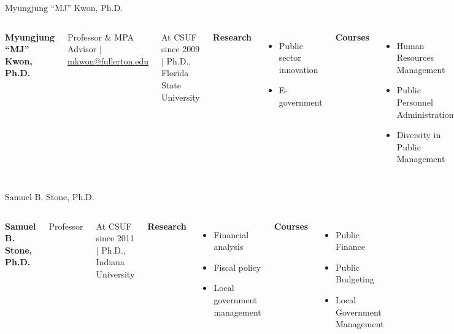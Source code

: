 \documentclass[10pt,aspectratio=169]{beamer}
\begin{document}
\begin{frame}{Myungjung ``MJ'' Kwon, Ph.D.}
\begin{columns}[T,onlytextwidth]
    \raggedright
  {\large\bfseries Myungjung ``MJ'' Kwon, Ph.D.}\par
    {Professor \& MPA Advisor \quad | \quad \href{mailto:mkwon@fullerton.edu}{mkwon@fullerton.edu}}\par
    {\footnotesize At CSUF since 2009 \quad | \quad Ph.D., Florida State University}\par\vspace{0.4em}

    \textbf{Research}
    \begin{itemize}
      \item Public sector innovation
      \item E-government
    \end{itemize}

    \textbf{Courses}
    \begin{itemize}
      \item Human Resources Management
      \item Public Personnel Administration
      \item Diversity in Public Management
    \end{itemize}

    \vspace*{0.25cm}
\end{columns}
\end{frame}

\begin{frame}{Samuel B. Stone, Ph.D.}
\begin{columns}[T,onlytextwidth]
    \raggedright
    {\large\bfseries Samuel B. Stone, Ph.D.}\par
    {Professor}\par
    {\footnotesize At CSUF since 2011 \quad | \quad Ph.D., Indiana University}\par\vspace{0.4em}

    \textbf{Research}
    \begin{itemize}
      \item Financial analysis
      \item Fiscal policy
      \item Local government management
    \end{itemize}

    \textbf{Courses}
    \begin{itemize}
      \item Public Finance
      \item Public Budgeting
      \item Local Government Management
    \end{itemize}

    \vspace*{0.25cm}
\end{columns}
\end{frame}
\end{document}
